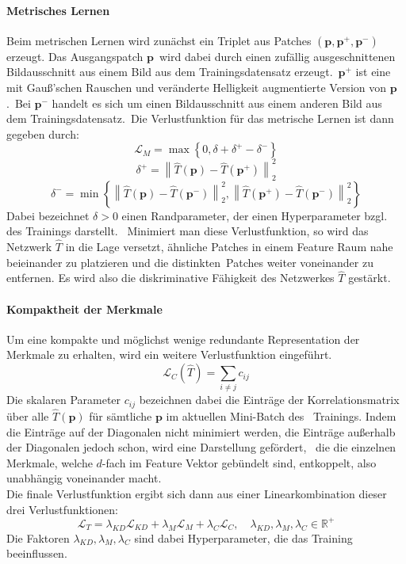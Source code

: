 \paragraph*{Metrisches Lernen}\label{par:metrischeslernen}
Beim metrischen Lernen wird zunächst ein Triplet aus Patches $(\mathbf{p}, \mathbf{p}^{+}, \mathbf{p}^{-})$ erzeugt. Das Ausgangspatch $\mathbf{p}$\
wird dabei durch einen zufällig ausgeschnittenen Bildausschnitt aus einem Bild aus dem Trainingsdatensatz erzeugt.\
$\mathbf{p}^{+}$ ist eine mit Gauß'schen Rauschen und veränderte Helligkeit augmentierte Version von $\mathbf{p}$.\
Bei $\mathbf{p}^{-}$ handelt es sich um einen Bildausschnitt aus einem anderen Bild aus dem Trainingsdatensatz.\
Die Verlustfunktion für das metrische Lernen ist dann gegeben durch: \
$$
\mathcal{L}_{M} = \max\left\{0,  \delta + \delta^{+}-\delta^{-}\right\}
$$
$$
\delta^{+}=\left\lVert \hat{T}(\mathbf{p})-\hat{T}(\mathbf{p}^{+}) \right\rVert_{2}^{2}
$$
$$
\delta^{-}=\min\left\{\left\lVert \hat{T}(\mathbf{p})-\hat{T}(\mathbf{p}^{-}) \right\rVert_{2}^{2}, \left\lVert \hat{T}(\mathbf{p}^{+})-\hat{T}(\mathbf{p}^{-}) \right\rVert_{2}^{2} \right\}
$$
Dabei bezeichnet $\delta>0$ einen Randparameter, der einen Hyperparameter bzgl. des Trainings darstellt. \
Minimiert man diese Verlustfunktion, so wird das Netzwerk $\hat{T}$ in die Lage versetzt, ähnliche Patches in einem Feature Raum nahe beieinander zu platzieren und die distinkten\
Patches weiter voneinander zu entfernen. Es wird also die diskriminative Fähigkeit des Netzwerkes $\hat{T}$ gestärkt.\
\paragraph*{Kompaktheit der Merkmale}\label{par:kompaktheitdermerkmale}
Um eine kompakte und möglichst wenige redundante Representation der Merkmale zu erhalten, wird ein weitere Verlustfunktion eingeführt. \
$$
\mathcal{L}_{C}\left(\hat{T}\right) = \sum_{i\neq j} c_{ij} 
$$
Die skalaren Parameter $c_{ij}$ bezeichnen dabei die Einträge der Korrelationsmatrix über alle $\hat{T}\left(\mathbf{p}\right)$ für sämtliche $\mathbf{p}$ im aktuellen Mini-Batch des \
Trainings. Indem die Einträge auf der Diagonalen nicht minimiert werden, die Einträge außerhalb der Diagonalen jedoch schon, wird eine Darstellung gefördert, \
die die einzelnen Merkmale, welche $d$-fach im Feature Vektor gebündelt sind, entkoppelt, also unabhängig voneinander macht. \\
Die finale Verlustfunktion ergibt sich dann aus einer Linearkombination dieser drei Verlustfunktionen: \
$$
\mathcal{L}_{T} = \lambda_{KD}\mathcal{L}_{KD} + \lambda_{M}\mathcal{L}_{M} + \lambda_{C}\mathcal{L}_{C}, \quad \lambda_{KD}, \lambda_{M}, \lambda_{C} \in \mathbb{R}^{+}
$$
Die Faktoren $\lambda_{KD}, \lambda_{M}, \lambda_{C}$ sind dabei Hyperparameter, die das Training beeinflussen. \
